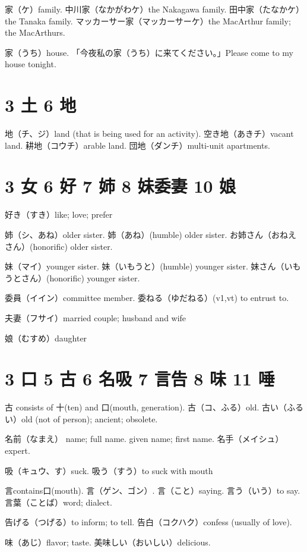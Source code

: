 家（ケ）family.
中川家（なかがわケ）the Nakagawa family.
田中家（たなかケ）the Tanaka family.
マッカーサー家（マッカーサーケ）the MacArthur family; the MacArthurs.

家（うち）house.
「今夜私の家（うち）に来てください。」Please come to my house tonight.

\section{3 土 6 地}

地（チ、ジ）land (that is being used for an activity).
空き地（あきチ）vacant land.
耕地（コウチ）arable land.
団地（ダンチ）multi-unit apartments.

\section{3 女 6 好 7 姉 8 妹委妻 10 娘}

好き（すき）like; love; prefer

姉（シ、あね）older sister.
姉（あね）(humble) older sister.
お姉さん（おねえさん）(honorific) older sister.

妹（マイ）younger sister.
妹（いもうと）(humble) younger sister.
妹さん（いもうとさん）(honorific) younger sister.

委員（イイン）committee member.
委ねる（ゆだねる）(v1,vt) to entrust to.

夫妻（フサイ）married couple; husband and wife

娘（むすめ）daughter

\section{3 口 5 古 6 名吸 7 言告 8 味 11 唾}

古 consists of 十(ten) and 口(mouth, generation).
古（コ、ふる）old.
古い（ふるい）old (not of person); ancient; obsolete.

名前（なまえ）
name; full name.
given name; first name.
名手（メイシュ）expert.

吸（キュウ、す）suck.
吸う（すう）to suck with mouth

言contains口(mouth).
言（ゲン、ゴン）.
言（こと）saying.
言う（いう）to say.
言葉（ことば）word; dialect.

告げる（つげる）to inform; to tell.
告白（コクハク）confess (usually of love).

味（あじ）flavor; taste.
美味しい（おいしい）delicious.

